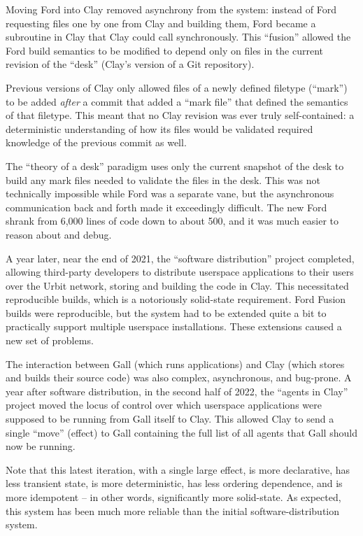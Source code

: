 \documentclass[twoside]{article}
\begin{document}
Moving Ford into Clay removed asynchrony from the system:  instead of Ford requesting files one by one from Clay and building them, Ford became a subroutine in Clay that Clay could call synchronously.  This ``fusion'' allowed the Ford build semantics to be modified to depend only on files in the current revision of the ``desk'' (Clay's version of a Git repository).

Previous versions of Clay only allowed files of a newly defined filetype (``mark'') to be added \emph{after} a commit that added a ``mark file'' that defined the semantics of that filetype.  This meant that no Clay revision was ever truly self-contained: a deterministic understanding of how its files would be validated required knowledge of the previous commit as well.

The ``theory of a desk'' paradigm uses only the current snapshot of the desk to build any mark files needed to validate the files in the desk.  This was not technically impossible while Ford was a separate vane, but the asynchronous communication back and forth made it exceedingly difficult.  The new Ford shrank from 6,000 lines of code down to about 500, and it was much easier to reason about and debug.

A year later, near the end of 2021, the ``software distribution'' project completed, allowing third-party developers to distribute userspace applications to their users over the Urbit network, storing and building the code in Clay.  This necessitated reproducible builds, which is a notoriously solid-state requirement.  Ford Fusion builds were reproducible, but the system had to be extended quite a bit to practically support multiple userspace installations.  These extensions caused a new set of problems.

The interaction between Gall (which runs applications) and Clay (which stores and builds their source code) was also complex, asynchronous, and bug-prone.  A year after software distribution, in the second half of 2022, the ``agents in Clay'' project moved the locus of control over which userspace applications were supposed to be running from Gall itself to Clay.  This allowed Clay to send a single ``move'' (effect) to Gall containing the full list of all agents that Gall should now be running.

Note that this latest iteration, with a single large effect, is more declarative, has less transient state, is more deterministic, has less ordering dependence, and is more idempotent – in other words, significantly more solid-state.  As expected, this system has been much more reliable than the initial software-distribution system.
\end{document}
